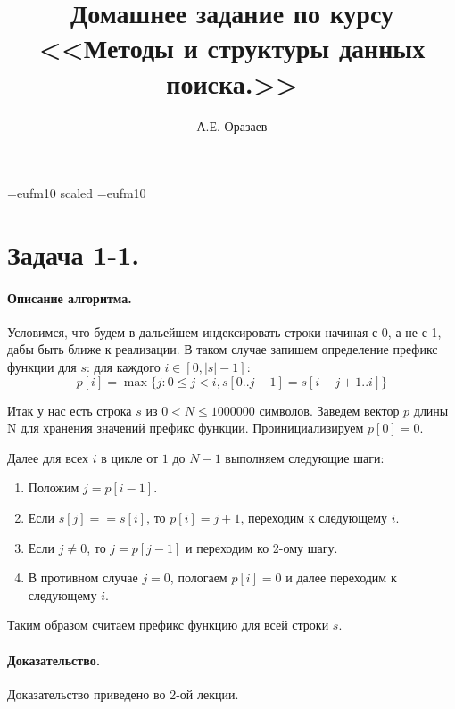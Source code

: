 \documentclass[12pt]{article}
\title{\bf Домашнее задание по курсу \\ <<Методы
и структуры данных поиска.>>}
\author{А.Е. Оразаев}
\date{}
\begin{document}
\voffset=-20mm
\hoffset=-12mm
\font\Got=eufm10 scaled \font\Got=eufm10

\maketitle

\section{Задача 1-1.}
\paragraph{Описание алгоритма.}
Условимся, что будем в дальейшем индексировать строки начиная с 0,
а не с 1, дабы быть ближе к реализации. В таком случае запишем определение
префикс функции для $ s $: для каждого $ i \in [0, |s| - 1] $:
$$
    p[i] = \max\{j: 0 \le j < i, s[0 .. j - 1] = s[i - j + 1 .. i]\}
$$

Итак у нас есть строка $ s $ из $ 0 < N \le 1000000$ символов.
Заведем вектор $ p $ длины N для хранения значений префикс функции.
Проинициализируем $ p[0] = 0 $.

Далее для всех $ i $ в цикле от $ 1 $ до $ N - 1 $ выполняем следующие шаги:
\begin{enumerate}
    \item Положим $ j = p[i - 1] $.
    \item Если $ s[j] == s[i] $, то $ p[i] = j + 1 $, переходим
          к следующему $ i $.
    \item Если $ j \ne 0 $, то $ j = p[j - 1] $ и переходим ко 2-ому шагу.
    \item В противном случае $ j = 0 $, пологаем $ p[i] = 0 $ и далее
          переходим к следующему $ i $.
\end{enumerate}

Таким образом считаем префикс функцию для всей строки $ s $.



\paragraph{Доказательство.}
Доказательство приведено во 2-ой лекции.
\end{document}

